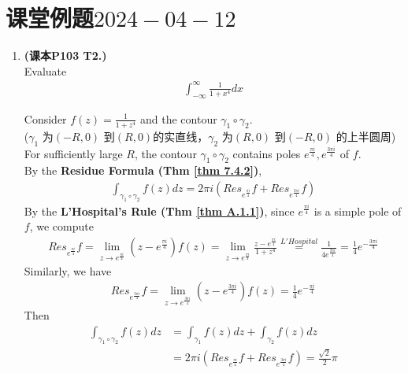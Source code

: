 \section{课堂例题$2024-04-12$}
\begin{enumerate}
	\item \textbf{(课本P103 T2.)}\\
	Evaluate 
	\begin{align}
		\int_{-\infty}^{\infty}{\frac{1}{1 + x^4} dx}
	\end{align}
	
	\vspace{2em}
	\begin{solution}
		Consider $f(z) = \frac{1}{1 + z^4}$ and the contour $\gamma_1 \circ \gamma_2$. \\
		\hspace*{5em}($\gamma_1$ 为$(-R, 0)$ 到$(R , 0)$的实直线，$\gamma_2$ 为$(R,0)$ 到$(-R,0)$ 的上半圆周)\\
		For sufficiently large $R$, the contour $\gamma_1 \circ \gamma_2$ contains poles $e^{\frac{\pi i}{4}} , e^{\frac{3\pi i}{4}}$ of $f$. \\
		By the \textbf{Residue Formula (Thm \ref{thm 7.4.2})},
		\begin{align}
			\int_{\gamma_1 \circ \gamma_2}{f(z) dz} = 2 \pi i \left( Res_{e^{\frac{\pi i}{4}}}f + Res_{e^{\frac{3\pi i}{4}}}f \right)
		\end{align}
		By the \textbf{L'Hospital's Rule (Thm \ref{thm A.1.1})}, since $e^{\frac{\pi i}{4}}$ is a simple pole of $f$, we compute
		\begin{align}
			Res_{e^{\frac{\pi i}{4}}}f 
			= \lim_{z \to e^{\frac{\pi i}{4}}}{(z - e^{\frac{\pi i}{4}}) f(z)}
			= \lim_{z \to e^{\frac{\pi i}{4}}}{\frac{z - e^{\frac{\pi i}{4}}}{1 + z^4}}
			\overset{L'Hospital}{=} \frac{1}{4 e^{\frac{3\pi i}{4}}} 
			= \frac{1}{4} e^{-\frac{3 \pi i}{4}}
		\end{align}
		Similarly, we have
		\begin{align}
			Res_{e^{\frac{3 \pi i}{4}}}f = \lim_{z \to e^{\frac{3 \pi i}{4}}}{(z - e^{\frac{3 \pi i}{4}}) f(z)} = \frac{1}{4} e^{-\frac{\pi i}{4}}
		\end{align}
		Then
		\begin{align}
			\int_{\gamma_1 \circ \gamma_2}{f(z) dz} 
			&= \int_{\gamma_1}{f(z) dz} + \int_{\gamma_2}{f(z) dz} \\ 
			&= 2 \pi i \left( Res_{e^{\frac{\pi i}{4}}}f + Res_{e^{\frac{3\pi i}{4}}}f \right) 
			= \frac{\sqrt{2}}{2}\pi 
		\end{align}

\end{solution}
\end{enumerate}
